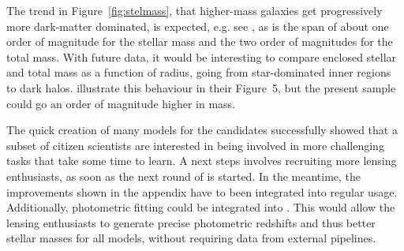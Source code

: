 The trend in Figure~\ref{fig:stelmass}, that higher-mass galaxies get
progressively more dark-matter dominated, is expected,
e.g. see \cite{2005ApJ...623L...5F}, as is the span of about one order
of magnitude for the stellar mass and the two order of magnitudes for the total
mass.
With future data, it would be interesting to compare enclosed
stellar and total mass as a function of radius, going from
star-dominated inner regions to dark halos.
\cite{2011ApJ...740...97L} illustrate this behaviour in their
Figure~5, but the present sample could go an order of magnitude higher
in mass.

The quick creation of many models for the {\SW} candidates successfully showed
that a subset of citizen scientists are interested in being involved in more
challenging tasks that take some time to learn. A next steps involves
recruiting more lensing enthusiasts, as soon as the next round of {\SW} is
started.
In the meantime, the improvements shown in the appendix have to been integrated
into regular {\SpL} usage.
Additionally, photometric fitting could be integrated into {\SpL}.
This would allow the lensing enthusiasts to generate precise photometric
redshifts and thus better stellar masses for all models, without requiring
data from external pipelines.

